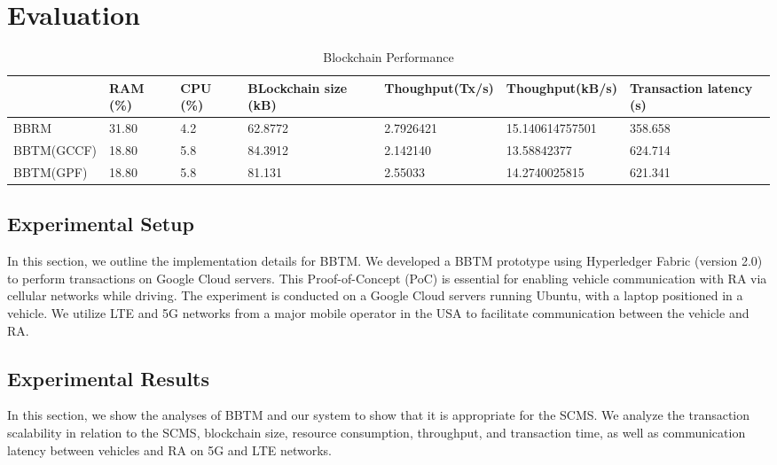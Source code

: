 \section{Evaluation}
\label{impl}

\captionsetup[table]{skip=12pt}
\begin{table*}[hbt!]
\small
\centering 
{\begin{tabular}{ |p{2cm}|p{1.6cm}|p{1.6cm}|p{2cm}|p{2.5cm}|p{2.5cm}|p{2cm}| } 
\hline
 & \textbf{RAM (\%)} & \textbf{CPU (\%)}& \textbf{BLockchain size (kB)}& \textbf{Thoughput(Tx/s)}& \textbf{Thoughput(kB/s)}& \textbf{Transaction latency (s)}\\\hline
BBRM~\cite{sarker2021blockchain} & 31.80 & 4.2 & 62.8772 & 2.7926421 & 15.140614757501 & 358.658 \\\hline
BBTM(GCCF) & 18.80 & 5.8 & 84.3912 & 2.142140 & 13.58842377 & 624.714 \\\hline
BBTM(GPF) & 18.80 & 5.8 & 81.131 & 2.55033 & 14.2740025815 & 621.341 \\\hline
\end{tabular}} 
\caption{Blockchain Performance}
\label{tlb:Block}
\end{table*}

\subsection{Experimental Setup}
In this section, we outline the implementation details for BBTM. We developed a BBTM prototype using Hyperledger Fabric (version 2.0) to perform transactions on Google Cloud servers. This Proof-of-Concept (PoC) is essential for enabling vehicle communication with RA via cellular networks while driving. The experiment is conducted on a Google Cloud servers running Ubuntu, with a laptop positioned in a vehicle. We utilize LTE and 5G networks from a major mobile operator in the USA to facilitate communication between the vehicle and RA.  
\subsection{Experimental Results}
In this section, we show the analyses of BBTM and our system to show that it is appropriate for the SCMS. We analyze the transaction scalability in relation to the SCMS, blockchain size, resource consumption, throughput, and transaction time, as well as communication latency between vehicles and RA on 5G and LTE networks.

